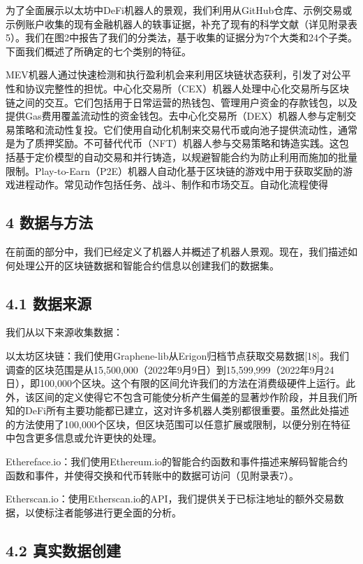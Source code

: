 为了全面展示以太坊中DeFi机器人的景观，我们利用从GitHub仓库、示例交易或示例账户收集的现有金融机器人的轶事证据，补充了现有的科学文献（详见附录表5）。我们在图2中报告了我们的分类法，基于收集的证据分为7个大类和24个子类。下面我们概述了所确定的七个类别的特征。

MEV机器人通过快速检测和执行盈利机会来利用区块链状态获利，引发了对公平性和协议完整性的担忧。中心化交易所（CEX）机器人处理中心化交易所与区块链之间的交互。它们包括用于日常运营的热钱包、管理用户资金的存款钱包，以及提供Gas费用覆盖流动性的资金钱包。去中心化交易所（DEX）机器人参与定制交易策略和流动性复投。它们使用自动化机制来交易代币或向池子提供流动性，通常是为了质押奖励。不可替代代币（NFT）机器人参与交易策略和铸造实践。这包括基于定价模型的自动交易和并行铸造，以规避智能合约为防止利用而施加的批量限制。Play-to-Earn（P2E）机器人自动化基于区块链的游戏中用于获取奖励的游戏进程动作。常见动作包括任务、战斗、制作和市场交互。自动化流程使得

\subsection*{4 数据与方法}

在前面的部分中，我们已经定义了机器人并概述了机器人景观。现在，我们描述如何处理公开的区块链数据和智能合约信息以创建我们的数据集。

\subsection*{4.1 数据来源}

我们从以下来源收集数据：

以太坊区块链：我们使用Graphene-lib从Erigon归档节点获取交易数据[18]。我们调查的区块范围是从15,500,000（2022年9月9日）到15,599,999（2022年9月24日），即100,000个区块。这个有限的区间允许我们的方法在消费级硬件上运行。此外，该区间的定义使得它不包含可能使分析产生偏差的显著炒作阶段，并且我们所知的DeFi所有主要功能都已建立，这对许多机器人类别都很重要。虽然此处描述的方法使用了100,000个区块，但区块范围可以任意扩展或限制，以便分别在特征中包含更多信息或允许更快的处理。

Ethereface.io：我们使用Ethereum.io的智能合约函数和事件描述来解码智能合约函数和事件，并使得交换和代币转账中的数据可访问（见附录表7）。

Etherscan.io：使用Etherscan.io的API，我们提供关于已标注地址的额外交易数据，以使标注者能够进行更全面的分析。

\subsection*{4.2 真实数据创建}

